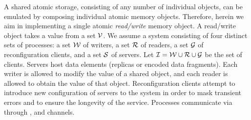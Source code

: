 A shared atomic storage, consisting of any number of individual objects,  can be emulated
by composing individual atomic memory objects. Therefore, herein we aim
in implementing a single atomic \textit{read/write} memory object. %
{A read/write} object takes a value from a set ${\mathcal V}$. 
We assume a system consisting of four distinct sets of processes: 
a set $\mathcal{W}$ of writers, a set $\mathcal{R}$ of readers, a set $\mathcal{G}$ of 
reconfiguration clients, and a set $\mathcal{S}$ of servers. Let $\mathcal{I} = \mathcal{W} \cup\mathcal{R}\cup\mathcal{G}$ 
be the set of clients. Servers host data elements (replicas or encoded data fragments).
Each writer is allowed to modify the value of a shared object, and each reader is allowed to obtain 
the value of that object. Reconfiguration clients attempt  to introduce new 
 configuration of servers to the 
system in order to mask transient errors and to ensure the longevity of the service. 
Processes communicate via  through 
, and  channels. 
%

